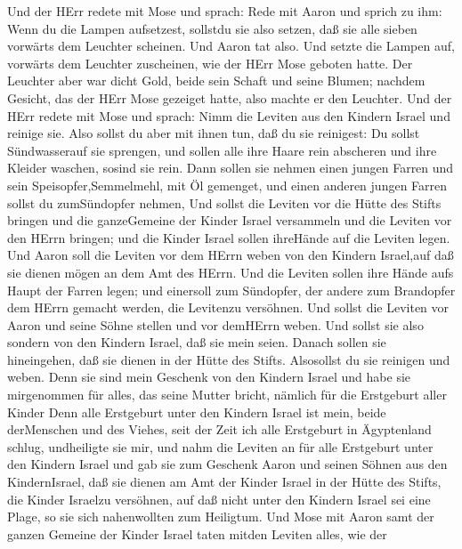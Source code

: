  Und der HErr redete mit Mose und sprach:  Rede
mit Aaron und sprich zu ihm: Wenn du die Lampen aufsetzest, sollstdu sie
also setzen, daß sie alle sieben vorwärts dem Leuchter scheinen.
 Und Aaron tat also. Und setzte die Lampen auf, vorwärts dem
Leuchter zuscheinen, wie der HErr Mose geboten hatte.  Der
Leuchter aber war dicht Gold, beide sein Schaft und seine Blumen;
nachdem Gesicht, das der HErr Mose gezeiget hatte, also machte er den
Leuchter.  Und der HErr redete mit Mose und sprach:
 Nimm die Leviten aus den Kindern Israel und reinige sie.
 Also sollst du aber mit ihnen tun, daß du sie reinigest: Du
sollst Sündwasserauf sie sprengen, und sollen alle ihre Haare rein
abscheren und ihre Kleider waschen, sosind sie rein.  Dann
sollen sie nehmen einen jungen Farren und sein Speisopfer,Semmelmehl,
mit Öl gemenget, und einen anderen jungen Farren sollst du zumSündopfer
nehmen,  Und sollst die Leviten vor die Hütte des Stifts
bringen und die ganzeGemeine der Kinder Israel versammeln 
und die Leviten vor den HErrn bringen; und die Kinder Israel sollen
ihreHände auf die Leviten legen.  Und Aaron soll die
Leviten vor dem HErrn weben von den Kindern Israel,auf daß sie dienen
mögen an dem Amt des HErrn.  Und die Leviten sollen ihre
Hände aufs Haupt der Farren legen; und einersoll zum Sündopfer, der
andere zum Brandopfer dem HErrn gemacht werden, die Levitenzu versöhnen.
 Und sollst die Leviten vor Aaron und seine Söhne stellen
und vor demHErrn weben.  Und sollst sie also sondern von
den Kindern Israel, daß sie mein seien.  Danach sollen sie
hineingehen, daß sie dienen in der Hütte des Stifts. Alsosollst du sie
reinigen und weben.  Denn sie sind mein Geschenk von den
Kindern Israel und habe sie mirgenommen für alles, das seine Mutter
bricht, nämlich für die Erstgeburt aller Kinder  Denn alle
Erstgeburt unter den Kindern Israel ist mein, beide derMenschen und des
Viehes, seit der Zeit ich alle Erstgeburt in Ägyptenland schlug,
undheiligte sie mir,  und nahm die Leviten an für alle
Erstgeburt unter den Kindern Israel  und gab sie zum
Geschenk Aaron und seinen Söhnen aus den KindernIsrael, daß sie dienen
am Amt der Kinder Israel in der Hütte des Stifts, die Kinder Israelzu
versöhnen, auf daß nicht unter den Kindern Israel sei eine Plage, so sie
sich nahenwollten zum Heiligtum.  Und Mose mit Aaron samt
der ganzen Gemeine der Kinder Israel taten mitden Leviten alles, wie der
